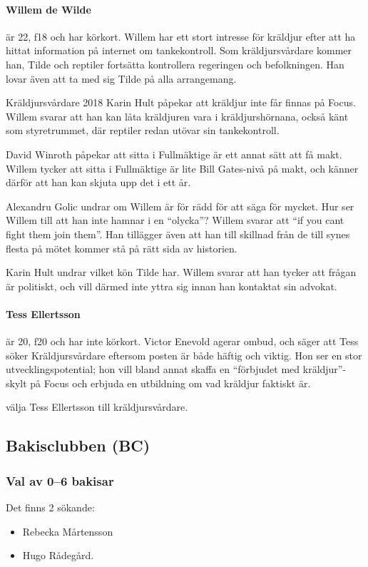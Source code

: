 \documentclass[hidelinks]{sektionsmote}
\begin{document}
\paragraph{Willem de Wilde} är 22, f18 och har körkort.
Willem har ett stort intresse för kräldjur efter att ha hittat information på internet om tankekontroll.
Som kräldjursvårdare kommer han, Tilde och reptiler fortsätta kontrollera regeringen och befolkningen.
Han lovar även att ta med sig Tilde på alla arrangemang.

Kräldjursvårdare 2018 Karin Hult påpekar att kräldjur inte får finnas på Focus.
Willem svarar att han kan låta kräldjuren vara i kräldjurshörnana, också känt som styretrummet, där reptiler redan utövar sin tankekontroll.

David Winroth påpekar att sitta i Fullmäktige är ett annat sätt att få makt.
Willem tycker att sitta i Fullmäktige är lite Bill Gates-nivå på makt, och känner därför att han kan skjuta upp det i ett år.

Alexandru Golic undrar om Willem är för rädd för att säga för mycket.
Hur ser Willem till att han inte hamnar i en \enquote{olycka}?
Willem svarar att \enquote{if you cant fight them join them}.
Han tillägger även att han till skillnad från de till synes flesta på mötet kommer stå på rätt sida av historien.

Karin Hult undrar vilket kön Tilde har.
Willem svarar att han tycker att frågan är politiskt, och vill därmed inte yttra sig innan han kontaktat sin advokat.

\paragraph{Tess Ellertsson} är 20, f20 och har inte körkort.
Victor Enevold agerar ombud, och säger att Tess söker Kräldjursvårdare eftersom posten är både häftig och viktig.
Hon ser en stor utvecklingspotential; hon vill bland annat skaffa en \enquote{förbjudet med kräldjur}-skylt på Focus och erbjuda en utbildning om vad kräldjur faktiskt är.

\begin{beslut}
  \item välja Tess Ellertsson till kräldjursvårdare.
\end{beslut}


\subsection{Bakisclubben (BC)}
\subsubsection{Val av 0--6 bakisar}
Det finns 2 sökande:
\begin{itemize}
    \item Rebecka Mårtensson
    \item Hugo Rådegård.
\end{itemize}
\end{document}

